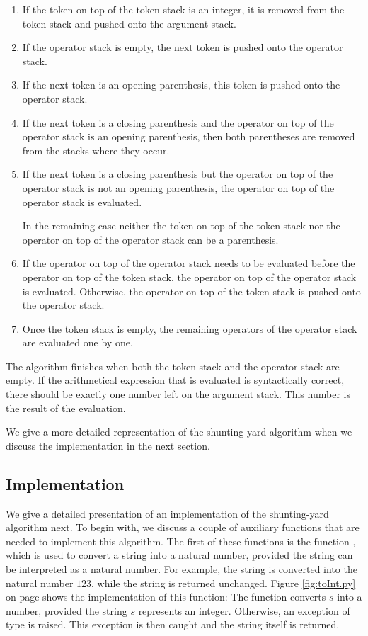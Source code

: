 \begin{enumerate}
\item If the token on top of the token stack is an integer, it is removed from the token stack and pushed onto
      the argument stack.
\item If the operator stack is empty, the next token is pushed onto the operator stack.
\item If the next token is an opening parenthesis, this token is pushed onto the operator stack.
\item If the next token is a closing parenthesis and the operator on top of the operator stack is an opening
      parenthesis, then both parentheses are removed from the stacks where they occur.
\item If the next token is a closing parenthesis but the operator on top of the operator stack is not an
      opening parenthesis,  the operator on top of the operator stack is evaluated.
 
      In the remaining case neither the token on top of the token stack nor the operator on top of the
      operator stack can be a parenthesis.  
\item If the operator on top of the operator stack needs to be evaluated before the operator on top of the token stack,
      the operator on top of the operator stack is evaluated.  Otherwise, the operator on top of the token
      stack is pushed onto the operator stack.
\item Once the token stack is empty, the remaining operators of the operator stack are evaluated one by one.    
\end{enumerate}
The algorithm finishes when both the token stack and the operator stack are empty.  If the arithmetical
expression that is evaluated is syntactically correct, there should be exactly one number left on the
argument stack.  This number is the result of the evaluation.
      
We give a more detailed representation of the shunting-yard algorithm when we discuss the implementation in the
next section. 

\subsection{Implementation}
We give a detailed presentation of an implementation of the shunting-yard algorithm next.  To begin with, we
discuss a couple of auxiliary 
functions that are needed to implement this algorithm.  The first of these functions is the function
, which is used to convert a string into a natural number, provided the string can be interpreted as a
natural number.  For example, the string  is converted into the natural number $123$, while the
string  is returned unchanged.  Figure \ref{fig:toInt.py} on page \pageref{fig:toInt.py} shows the
implementation of this function:  The function  converts $s$ into a number, provided the string
$s$ represents an integer.  Otherwise, an exception of type  is raised.  This exception is
then caught and the string itself is returned.


